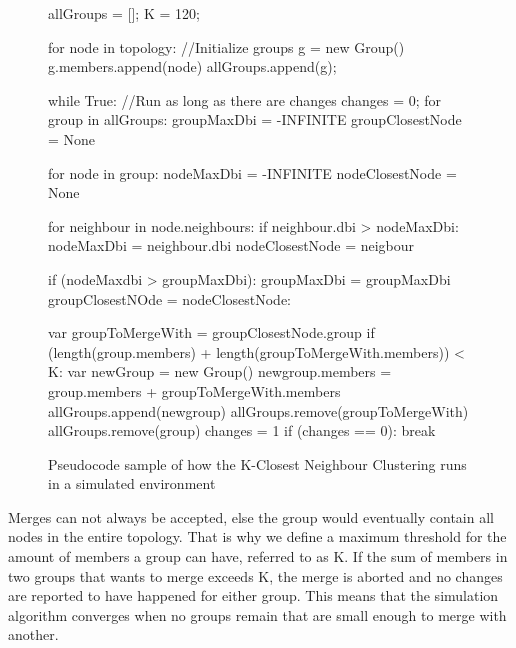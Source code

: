 	\begin{figure}
		\tiny
		\begin{python}
allGroups = [];
K = 120;

for node in topology: //Initialize groups
	g = new Group()
	g.members.append(node)
	allGroups.append(g);

while True: //Run as long as there are changes
	changes = 0;	
	for group in allGroups: 
		groupMaxDbi = -INFINITE
		groupClosestNode = None

		for node in group:
			nodeMaxDbi = -INFINITE
			nodeClosestNode = None

			for neighbour in node.neighbours:
				if neighbour.dbi > nodeMaxDbi:
					nodeMaxDbi = neighbour.dbi
					nodeClosestNode = neigbour

			if (nodeMaxdbi > groupMaxDbi):
				groupMaxDbi = groupMaxDbi
				groupClosestNOde = nodeClosestNode:

		var groupToMergeWith = groupClosestNode.group
		if (length(group.members) + length(groupToMergeWith.members)) < K:
			var newGroup = new Group()
			newgroup.members = group.members + groupToMergeWith.members
			allGroups.append(newgroup)
			allGroups.remove(groupToMergeWith)
			allGroups.remove(group)
			changes = 1
	if (changes == 0):
		break
		\end{python}
			\caption{Pseudocode sample of how the K-Closest Neighbour Clustering runs in a simulated environment}
			\label{fig:groupmerge}
	\end{figure}



Merges can not always be accepted, else the group would eventually contain all nodes in the entire topology. That is why we define a maximum threshold for the amount of members a group can have, 
referred to as K. If the sum of members in two groups that wants to merge exceeds K, the merge is aborted and no changes are reported to have happened for either group. 
This means that the simulation algorithm converges when no groups remain that are small enough to merge with another.
 
